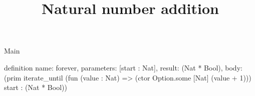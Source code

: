 \begin{lexlean}{Main}
\title{Natural number addition}
\begin{semanticmodule}
definition{
  name: forever,
  parameters: [start : Nat],
  result: (Nat * Bool),
  body: (prim iterate_until (fun (value : Nat) => (ctor Option.some [Nat] (value + 1))) start : (Nat * Bool))
}
\end{semanticmodule}
\end{lexlean}
